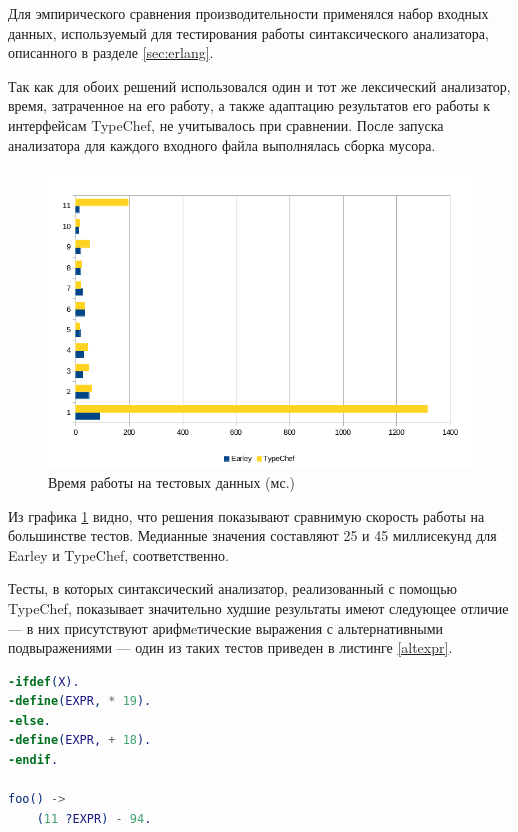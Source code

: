Для эмпирического сравнения производительности применялся набор входных данных, используемый для тестирования работы синтаксического анализатора, описанного в разделе \ref{sec:erlang}.

Так как для обоих решений использовался один и тот же лексический анализатор, время, затраченное на его работу, а также адаптацию результатов его работы к интерфейсам TypeChef, не учитывалось при сравнении. После запуска анализатора для каждого входного файла выполнялась сборка мусора.

\begin{figure}[h]
\includegraphics[width=\linewidth]{performance.png}
\caption{Время работы на тестовых данных (мс.)}
\label{chart}
\end{figure}

Из графика \ref{chart} видно, что решения показывают сравнимую скорость работы на большинстве тестов. Медианные значения составляют 25 и 45 миллисекунд для Earley и TypeChef, соответственно.

Тесты, в которых синтаксический анализатор, реализованный с помощью TypeChef, показывает значительно худшие результаты имеют следующее отличие --- в них присутствуют арифмeтические выражения с альтернативными подвыражениями --- один из таких тестов приведен в листинге \ref{altexpr}. 

\begin{minipage}{\linewidth}
\begin{lstlisting}[caption={Один из тестов с альтернативными подвыражениями},language=Erlang,label=altexpr]
-ifdef(X).
-define(EXPR, * 19).
-else.
-define(EXPR, + 18).
-endif.

foo() ->
    (11 ?EXPR) - 94.
\end{lstlisting}
\end{minipage}

